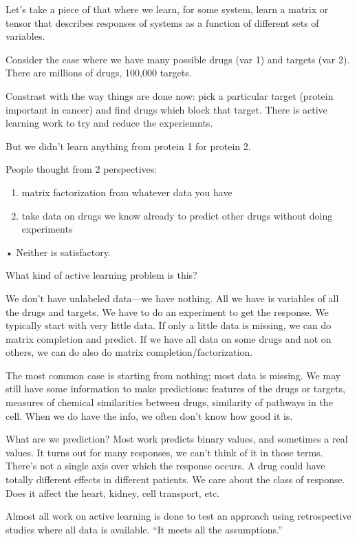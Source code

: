 Let's take a piece of that where we learn, for some system, learn a matrix or tensor that describes responses of systems as a function of different sets of variables.

Consider the case where we have many possible drugs (var 1) and targets (var 2). 
There are millions of drugs, 100,000 targets.

Constrast with the way things are done now: pick a particular target (protein important in cancer) and find drugs which block that target. There is active learning work to try and reduce the experiemnts.

But we didn't learn anything from protein 1 for protein 2.

People thought from 2 perspectives: 
\begin{enumerate}
\item
matrix factorization from whatever data you have
\item
take data on drugs we know already to predict other drugs without doing experiments
\end{enumerate}•
Neither is satisfactory.

What kind of active learning problem is this?

We don't have unlabeled data---we have nothing. All we have is variables of all the drugs and targets. We have to do an experiment to get the response. We typically start with very little data. If only a little data is missing, we can do matrix completion and predict. If we have all data on some drugs and not on others, we can do also do matrix completion/factorization.

The most common case is starting from nothing; most data is missing. We may still have some information to make predictions: features of the drugs or targets, measures of chemical similarities between drugs, similarity of pathways in the cell.  When we do have the info, we often don't know how good it is.

What are we prediction? Most work predicts binary values, and sometimes a real values. It turns out for many responses, we can't think of it in those terms. There's not a single axis over which the response occurs. A drug could have totally different effects in different patients. We care about the class of response. Does it affect the heart, kidney, cell transport, etc.

Almost all work on active learning is done to test an approach using retrospective studies where all data is available. ``It meets all the assumptions.''

